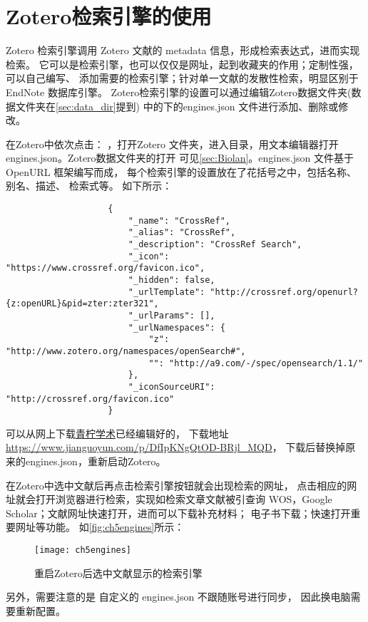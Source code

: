 \documentclass[cn,11pt,chinese]{elegantbook}
\begin{document}
		\section{Zotero检索引擎的使用}\label{sec:Engines}
			Zotero 检索引擎调用 Zotero 文献的 metadata 信息，形成检索表达式，进而实现检索。
			它可以是检索引擎，也可以仅仅是网址，起到收藏夹的作用；定制性强，可以自己编写、
			添加需要的检索引擎；针对单一文献的发散性检索，明显区别于 EndNote 数据库引擎。
			Zotero检索引擎的设置可以通过编辑Zotero数据文件夹(数据文件夹在\cref{sec:data_dir}提到)
			中的下的engines.json
			文件进行添加、删除或修改。

			在Zotero中依次点击：
			，打开Zotero 
			文件夹，进入目录，用文本编辑器打开engines.json。Zotero数据文件夹的打开
			可见\cref{sec:Biolan}。engines.json 文件基于 OpenURL 框架编写而成，
			每个检索引擎的设置放在了花括号之中，包括名称、别名、描述、
			检索式等。
			如下所示：
				\begin{lstlisting}
					{
						"_name": "CrossRef",
						"_alias": "CrossRef",
						"_description": "CrossRef Search",
						"_icon": "https://www.crossref.org/favicon.ico",
						"_hidden": false,
						"_urlTemplate": "http://crossref.org/openurl?{z:openURL}&pid=zter:zter321",
						"_urlParams": [],
						"_urlNamespaces": {
							"z": "http://www.zotero.org/namespaces/openSearch#",
							"": "http://a9.com/-/spec/opensearch/1.1/"
						},
						"_iconSourceURI": "http://crossref.org/favicon.ico"
					}

				\end{lstlisting}
			
			
				可以从网上下载\href{https://www.zhihu.com/people/iseex/answers
			}{青柠学术}已经编辑好的，
			下载地址\url{https://www.jianguoyun.com/p/DfIpKNgQtOD-BRjl_MQD}，
			下载后替换掉原来的engines.json，重新启动Zotero。

			在Zotero中选中文献后再点击检索引擎按钮就会出现检索的网址，
			点击相应的网址就会打开浏览器进行检索，实现如检索文章文献被引查询
			WOS，Google Scholar；文献网址快速打开，进而可以下载补充材料；
			电子书下载；快速打开重要网址等功能。	
			如\autoref{fig:ch5engines}所示：
				\begin{figure}[ht]
					\centering
					\texttt{[image: ch5engines]}
					\caption{重启Zotero后选中文献显示的检索引擎}
					\label{fig:ch5engines}
				\end{figure}
			另外，需要注意的是
		自定义的 engines.json 不跟随账号进行同步，
		因此换电脑需要重新配置。
\end{document}
